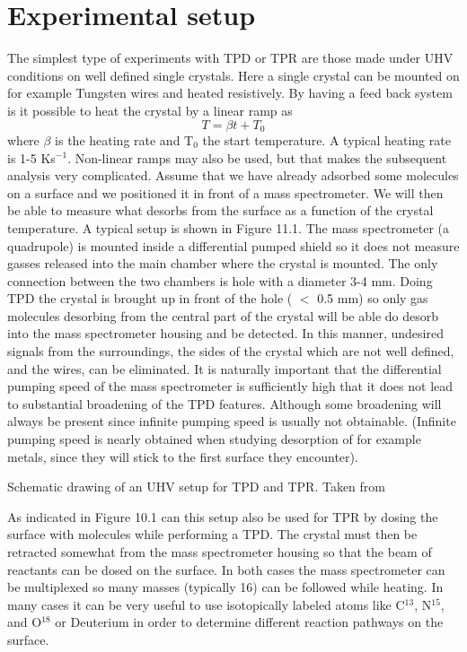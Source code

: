 \section{Experimental setup}
The simplest type of experiments with TPD or TPR are those made under UHV conditions on well defined single crystals. Here a single crystal can be mounted on  for example Tungsten wires and heated resistively. By having a feed back system is it possible to heat the crystal by a linear ramp as 
\begin{equation}
T = \beta t + T_0
\end{equation}
where $\beta$ is the heating rate and T$_0$ the start temperature. A typical heating rate is 1-5 Ks$^{-1}$. Non-linear ramps may also be used, but that makes the subsequent analysis very complicated.
Assume that we have already adsorbed some molecules on a surface and we positioned it in front of a mass spectrometer. We will then be able to measure what desorbs from the surface as a function of the crystal temperature. A typical setup is shown in Figure 11.1. The mass spectrometer (a quadrupole) is mounted inside a differential pumped shield so it does not measure  gasses released into the main chamber   where the crystal is mounted. The only connection between  the two chambers is hole with a diameter 3-4 mm. Doing TPD the crystal is brought up in  front of the hole ( $ < $ 0.5 mm) so only gas molecules desorbing from the central part of the crystal will be able do desorb into the mass spectrometer housing and be detected. In this manner, undesired signals from the surroundings, the sides of the crystal which are not well defined, and the wires, can be eliminated. It is naturally important that the differential pumping speed of the mass spectrometer is sufficiently high that it does not lead to substantial broadening of the TPD features. Although some broadening will always be  present since infinite pumping speed is usually not obtainable. (Infinite pumping speed is nearly obtained when studying desorption of for example metals, since they will stick to the first surface they encounter).

\vspace*{12cm}

 Schematic drawing of an UHV setup for TPD and TPR. Taken from \cite{Yates}

\vspace{1cm}

As indicated in Figure 10.1 can this setup also be used for TPR by dosing the surface with molecules while performing a TPD. The crystal must then be retracted somewhat from the mass spectrometer housing so that  the beam of reactants can be dosed on the surface. In both cases the mass spectrometer can be multiplexed so many masses (typically 16) can be followed while heating. In many cases it can be very useful to use isotopically labeled atoms like C$^{13}$, N$^{15}$, and O$^{18}$ or Deuterium in order to determine different  reaction pathways on the surface.

